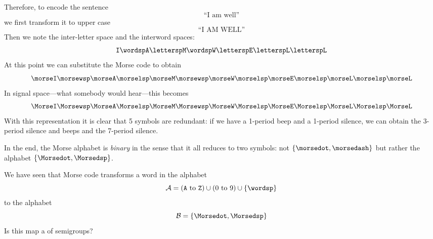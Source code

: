 \begin{example}
  Therefore, to encode the sentence
  \begin{equation}
  \text{``I am well''}
  \end{equation}
   we first transform it to upper case
   \begin{equation}
   \text{``I AM WELL''}
    \end{equation}
   Then we note the inter-letter space and the interword spaces:
  \begin{equation}
      \texttt{I} \wordsp \texttt{A} \lettersp \texttt{M} \wordsp \texttt{W} \lettersp
       \texttt{E} \lettersp \texttt{L} \lettersp \texttt{L}
  \end{equation}
  At this point we can substitute the Morse code to obtain
\begin{equation}
      \morseI \morsewsp \morseA \morselsp \morseM \morsewsp \morseW \morselsp \morseE \morselsp \morseL \morselsp \morseL
  \end{equation}
    In signal space---what somebody would hear---this becomes
\begin{equation}
      \MorseI \Morsewsp \MorseA \Morselsp \MorseM \Morsewsp \MorseW \Morselsp \MorseE \Morselsp \MorseL \Morselsp \MorseL
  \end{equation}
  With this representation it is clear that 5 symbols are redundant: if we have a 1-period beep and a 1-period silence, we can obtain the 3-period silence and beeps and the 7-period silence.

  In the end, the Morse alphabet is \emph{binary} in the sense that it all reduces to two symbols: not $\{\morsedot, \morsedash\}$ but rather the alphabet $\{\Morsedot, \Morsedsp\}$.

\end{example}

\begin{exercise}
We have seen that Morse code transforms a word in the alphabet
\begin{equation}
\mathcal{A} = (\texttt{A} \ \text{to}\ \texttt{Z}) \cup (0 \ \text{to}\ 9) \cup \{\wordsp\}
\end{equation}
to the alphabet
\begin{equation}
\mathcal{B} = \{\Morsedot, \Morsedsp\}
\end{equation}
Is this map a \whomo of semigroups?
\end{exercise}

